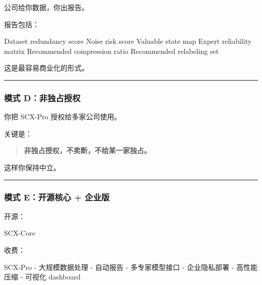 \documentclass[
  12pt,
]{ctexart}
\newenvironment{Shaded}{}{}
\newcommand{\NormalTok}[1]{#1}
\begin{document}
公司给你数据，你出报告。

报告包括：

\begin{Shaded}
\begin{Highlighting}[]
\NormalTok{Dataset redundancy score}
\NormalTok{Noise risk score}
\NormalTok{Valuable state map}
\NormalTok{Expert reliability matrix}
\NormalTok{Recommended compression ratio}
\NormalTok{Recommended relabeling set}
\end{Highlighting}
\end{Shaded}

这是最容易商业化的形式。

\begin{center}\rule{0.5\linewidth}{0.5pt}\end{center}

\subsubsection{模式
D：非独占授权}\label{ux6a21ux5f0f-dux975eux72ecux5360ux6388ux6743}

你把 SCX-Pro 授权给多家公司使用。

关键是：

\begin{quote}
\textbf{非独占授权，不卖断，不给某一家独占。}
\end{quote}

这样你保持中立。

\begin{center}\rule{0.5\linewidth}{0.5pt}\end{center}

\subsubsection{模式 E：开源核心 +
企业版}\label{ux6a21ux5f0f-eux5f00ux6e90ux6838ux5fc3-ux4f01ux4e1aux7248}

开源：

\begin{Shaded}
\begin{Highlighting}[]
\NormalTok{SCX{-}Core}
\end{Highlighting}
\end{Shaded}

收费：

\begin{Shaded}
\begin{Highlighting}[]
\NormalTok{SCX{-}Pro}
\NormalTok{  {-} 大规模数据处理}
\NormalTok{  {-} 自动报告}
\NormalTok{  {-} 多专家模型接口}
\NormalTok{  {-} 企业隐私部署}
\NormalTok{  {-} 高性能压缩}
\NormalTok{  {-} 可视化 dashboard}
\end{Highlighting}
\end{Shaded}
\end{document}
